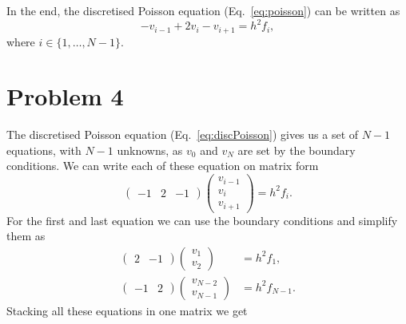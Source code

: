 \documentclass[english,notitlepage,aps,pra,10pt]{revtex4-2}
\begin{document}
In the end, the discretised Poisson equation (Eq.~\ref{eq:poisson}) can be written as
\begin{equation}
    -v_{i-1} + 2v_i - v_{i+1} = h^2 f_i,
    \label{eq:discPoisson}
\end{equation} 
where $i \in \{1,\dots, N-1\}$.

\section*{Problem 4}

The discretised Poisson equation (Eq.~\ref{eq:discPoisson}) gives us a set of $N-1$ equations, with $N-1$ unknowns, as $v_0$ and $v_N$ are set by the boundary conditions. We can write each of these equation on matrix form
\begin{equation}
    \begin{pmatrix}
        -1 & 2 & -1
    \end{pmatrix}
    \begin{pmatrix}
        v_{i-1} \\
        v_i \\
        v_{i+1}
    \end{pmatrix}
    = h^2 f_i.
\end{equation} 
For the first and last equation we can use the boundary conditions and simplify them as  
\begin{equation}
    \begin{split}
        \begin{pmatrix}
            2 & -1
        \end{pmatrix}
        \begin{pmatrix}
            v_1 \\
            v_2
        \end{pmatrix}
        &= h^2 f_1, \\
        \begin{pmatrix}
            -1 & 2
        \end{pmatrix}
        \begin{pmatrix}
            v_{N-2} \\
            v_{N-1}
        \end{pmatrix}
        &= h^2 f_{N-1}.
    \end{split}
\end{equation}
Stacking all these equations in one matrix we get 
\end{document}
